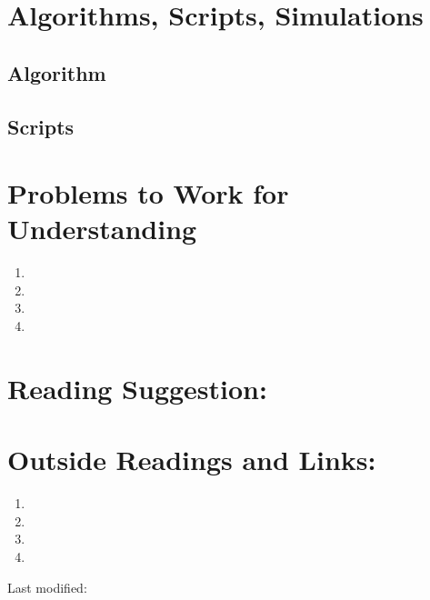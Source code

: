 \documentclass[12pt]{article}
\begin{document}
\section*{Algorithms, Scripts, Simulations}

\subsection*{Algorithm}

\subsection*{Scripts}

% 

\hr

\section*{Problems to Work for Understanding}
\begin{enumerate}
    \item
    \item
    \item
    \item
\end{enumerate}


\hr

\section*{Reading Suggestion:}




\hr

\section*{Outside Readings and Links:}
\begin{enumerate}
    \item
    \item
    \item
    \item
\end{enumerate}

\hr

\mydisclaim \myfooter

Last modified:  \flastmod
\end{document}
